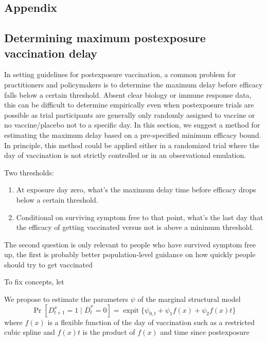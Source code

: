 \documentclass[11pt]{article}
\begin{document}
\begin{appendix}

    \renewcommand{\thefigure}{A\arabic{figure}}
    \setcounter{figure}{0}
    
    \renewcommand{\thetable}{A\arabic{table}}
    \setcounter{table}{0}
    
    \renewcommand{\theequation}{A\arabic{equation}}
    \setcounter{equation}{0}

    \newpage

    \section{Appendix}

    \subsection{Determining maximum postexposure vaccination delay}
    In setting guidelines for postexposure vaccination, a common problem for practitioners and policymakers is to determine the maximum delay before efficacy falls below a certain threshold. Absent clear biology or immune response data, this can be difficult to determine empirically even when postexposure trials are possible as trial participants are generally only randomly assigned to vaccine or no vaccine/placebo not to a specific day. In this section, we suggest a method for estimating the maximum delay based on a pre-specified minimum efficacy bound. In principle, this method could be applied either in a randomized trial where the day of vaccination is not strictly controlled or in an observational emulation. 
 
    Two thresholds:
    \begin{enumerate}
        \item At exposure day zero, what's the maximum delay time before efficacy drops below a certain threshold.
        \item Conditional on surviving symptom free to that point, what's the last day that the efficacy of getting vaccinated versus not is above a minimum threshold.
    \end{enumerate}
    The second question is only relevant to people who have survived symptom free up, the first is probably better population-level guidance on how quickly people should try to get vaccinated 

    To fix concepts, let 

    We propose to estimate the parameters $\psi$ of the marginal structural model 
    $$\Pr[D^{x}_{t+1} = 1 \mid \overline{D}^x_t = 0] =  \operatorname{expit}\{\psi_{0,t} + \psi_1 f(x) + \psi_2 f(x) t\}$$
    where $f(x)$ is a flexible function of the day of vaccination such as a restricted cubic spline and $f(x)t$ is the product of $f(x)$ and time since postexposure
    

\end{appendix}
\end{document}
